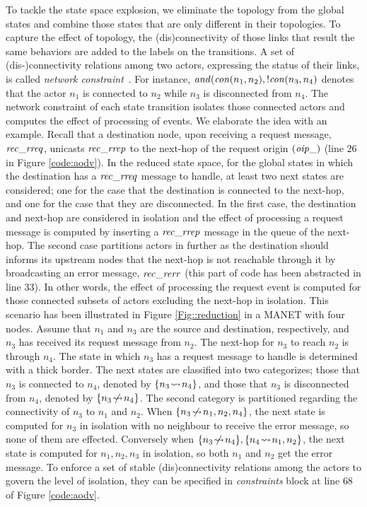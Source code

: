 To tackle the state space explosion, we eliminate the topology from the global states and combine those states that are only different in their topologies. To capture the effect of topology, the (dis)connectivity of those links that result the same behaviors are added to the labels on the transitions. A set of (dis-)connectivity relations among two actors, expressing the status of their links, is called \emph{network constraint}~\cite{FatemehFI10,FatemehFI19}. For instance, ${\it and}({\it con}(n_1,n_2),!{\it con}(n_3,n_4)$ denotes that the actor  $n_1$ is connected to $n_2$ while $n_3$ is disconnected from $n_4$. The network constraint of each state transition isolates those connected actors and computes the effect of processing of events. %
We elaborate the idea with an example. Recall that a destination node, upon receiving a request message, ${\it rec\_rreq}$, unicasts ${\it rec\_rrep}$ to the next-hop of the request origin $({\it oip\_})$ (line $26$ in Figure \ref{code:aodv}). In the reduced state space,  for the global states in which the destination has a ${\it rec\_rreq}$ message to handle, at least two next states are considered; one for the case that the destination is connected to the next-hop, and one for the case that they are disconnected. In the first case, the destination and next-hop are considered in isolation and the effect of processing a request message is computed by inserting a ${\it rec\_rrep}$ message in the queue of the next-hop. The second case partitions actors in further as the destination should informs its upstream nodes that the next-hop is not reachable through it by broadcasting an error message, ${\it rec\_rerr}$ (this part of code has been abstracted in line $33$). In other words, the effect of processing the request event is computed for those connected subsets of actors excluding the next-hop in isolation. This scenario has been illustrated in Figure \ref{Fig::reduction} in a MANET with four nodes. Assume that $n_1$ and $n_3$ are the source and destination, respectively, and $n_3$ has received its request message from $n_2$. The next-hop for $n_3$ to reach $n_2$ is through $n_4$. The state in which $n_3$ has a request message to handle is determined with a thick border. The next states are classified into two categorizes; those that $n_3$ is connected to $n_4$, denoted by $\{n_3\!\rightsquigarrow\! n_4\}$, and those that $n_3$ is disconnected from $n_4$, denoted by $\{n_3\!\mathrel{\hspace{.1em}\not\hspace{-.1em}\rightsquigarrow}\! n_4\}$. The second category is partitioned regarding the connectivity of $n_3$ to $n_1$ and $n_2$. When $\{n_3\!\mathrel{\hspace{.1em}\not\hspace{-.1em}\rightsquigarrow}\! n_1,n_2,n_4\}$, the next state is computed for $n_3$ in isolation with no neighbour to receive the error message, so none of them are effected. Conversely when $\{n_3\!\mathrel{\hspace{.1em}\not\hspace{-.1em}\rightsquigarrow}\! n_4\},\{n_4\!\rightsquigarrow\! n_1,n_2\}$, the next state is computed for $n_1,n_2,n_3$ in isolation, so both $n_1$ and $n_2$ get the error message. To enforce a set of stable (dis)connectivity relations among the actors to govern the level of isolation, they can be specified in \emph{constraints} block at line $68$ of Figure \ref{code:aodv}.  


